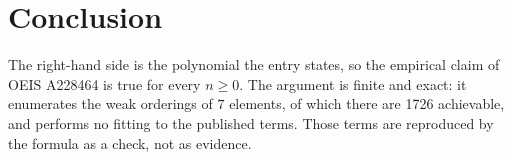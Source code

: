 \documentclass[11pt,a4paper]{article}
\theoremstyle{plain}
\theoremstyle{definition}
\begin{document}
\section{Conclusion}

The right-hand side is the polynomial the entry states, so the empirical claim of OEIS A228464 is
true for every $n\ge 0$. The argument is finite and exact: it enumerates the weak orderings of
$7$ elements, of which there are 1726 achievable, and performs no fitting to the
published terms. Those terms are reproduced by the formula as a check, not as evidence.
\end{document}
